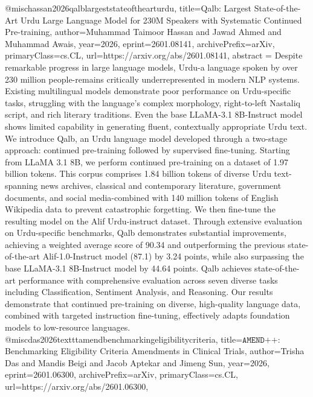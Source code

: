 {}@misc{hassan2026qalblargeststateofthearturdu,
      title={Qalb: Largest State-of-the-Art Urdu Large Language Model for 230M Speakers with Systematic Continued Pre-training}, 
      author={Muhammad Taimoor Hassan and Jawad Ahmed and Muhammad Awais},
      year={2026},
      eprint={2601.08141},
      archivePrefix={arXiv},
      primaryClass={cs.CL},
      url={https://arxiv.org/abs/2601.08141},
      abstract = {Despite remarkable progress in large language models, Urdu-a language spoken by over 230 million people-remains critically underrepresented in modern NLP systems. Existing multilingual models demonstrate poor performance on Urdu-specific tasks, struggling with the language's complex morphology, right-to-left Nastaliq script, and rich literary traditions. Even the base LLaMA-3.1 8B-Instruct model shows limited capability in generating fluent, contextually appropriate Urdu text. We introduce Qalb, an Urdu language model developed through a two-stage approach: continued pre-training followed by supervised fine-tuning. Starting from LLaMA 3.1 8B, we perform continued pre-training on a dataset of 1.97 billion tokens. This corpus comprises 1.84 billion tokens of diverse Urdu text-spanning news archives, classical and contemporary literature, government documents, and social media-combined with 140 million tokens of English Wikipedia data to prevent catastrophic forgetting. We then fine-tune the resulting model on the Alif Urdu-instruct dataset. Through extensive evaluation on Urdu-specific benchmarks, Qalb demonstrates substantial improvements, achieving a weighted average score of 90.34 and outperforming the previous state-of-the-art Alif-1.0-Instruct model (87.1) by 3.24 points, while also surpassing the base LLaMA-3.1 8B-Instruct model by 44.64 points. Qalb achieves state-of-the-art performance with comprehensive evaluation across seven diverse tasks including Classification, Sentiment Analysis, and Reasoning. Our results demonstrate that continued pre-training on diverse, high-quality language data, combined with targeted instruction fine-tuning, effectively adapts foundation models to low-resource languages.}
}@misc{das2026textttamendbenchmarkingeligibilitycriteria,
      title={$\texttt{AMEND++}$: Benchmarking Eligibility Criteria Amendments in Clinical Trials}, 
      author={Trisha Das and Mandis Beigi and Jacob Aptekar and Jimeng Sun},
      year={2026},
      eprint={2601.06300},
      archivePrefix={arXiv},
      primaryClass={cs.CL},
      url={https://arxiv.org/abs/2601.06300},
}
